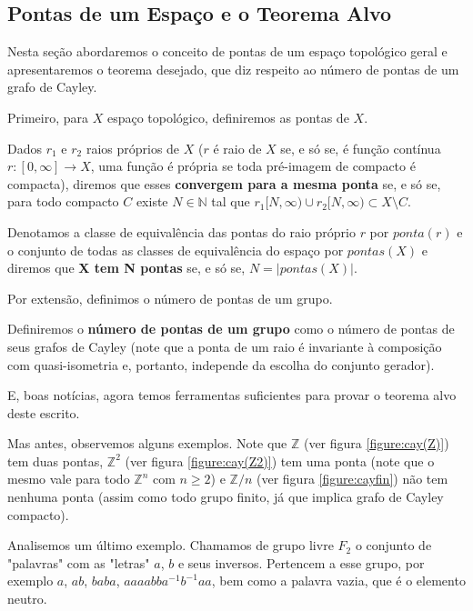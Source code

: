 \subsection{Pontas de um Espaço e o Teorema Alvo}
Nesta seção abordaremos o conceito de pontas de um espaço topológico geral e apresentaremos o teorema desejado, que diz respeito ao número de pontas de um grafo de Cayley.

Primeiro, para $X$ espaço topológico, definiremos as pontas de $X$.

\begin{definition}
Dados $r_1$ e $r_2$  raios próprios de $X$ ($r$ é raio de $X$ se, e só se, é função contínua $r:[0, \infty] \rightarrow X$, uma função é própria se toda pré-imagem de compacto é compacta), diremos que esses \textbf{convergem para a mesma ponta} se, e só se, para todo compacto $C$ existe $N \in \mathbb{N}$ tal que $r_1[N, \infty) \cup r_2[N, \infty) \subset X \setminus C$.
\end{definition}
\begin{definition}
Denotamos a classe de equivalência das pontas do raio próprio $r$ por $ponta(r)$ e o conjunto de todas as classes de equivalência do espaço por $pontas(X)$ e diremos que \textbf{X tem N pontas} se, e só se, $N = |pontas(X)|$.
\end{definition}

Por extensão, definimos o número de pontas de um grupo.

\begin{definition}
Definiremos o \textbf{número de pontas de um grupo} como o número de pontas de seus grafos de Cayley (note que a ponta de um raio é invariante à composição com quasi-isometria e, portanto, independe da escolha do conjunto gerador).
\end{definition}

E, boas notícias, agora temos ferramentas suficientes para provar o teorema alvo deste escrito.

Mas antes, observemos alguns exemplos. Note que $\mathbb{Z}$ (ver figura \ref{figure:cay(Z)}) tem duas pontas, $\mathbb{Z}^2$ (ver figura \ref{figure:cay(Z2)}) tem uma ponta (note que o mesmo vale para todo $\mathbb{Z}^n$ com $n \geq 2$) e $\mathbb{Z}/n$ (ver figura \ref{figure:cayfin}) não tem nenhuma ponta (assim como todo grupo finito, já que implica grafo de Cayley compacto).

Analisemos um último exemplo. Chamamos de grupo livre $F_2$ o conjunto de "palavras" com as "letras" $a$, $b$ e seus inversos. Pertencem a esse grupo, por exemplo $a$, $ab$, $baba$, $aaaabba^{-1}b^{-1}aa$, bem como a palavra vazia, que é o elemento neutro.

